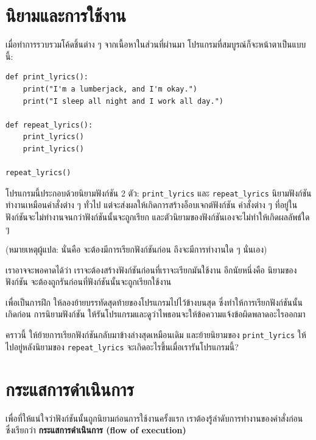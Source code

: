 \section{นิยามและการใช้งาน} %

เมื่อทำการรวบรวมโค้ดชิ้นต่าง ๆ จากเนื้อหาในส่วนที่ผ่านมา โปรแกรมที่สมบูรณ์ก็จะหน้าตาเป็นแบบนี้:

\begin{verbatim}
def print_lyrics():
    print("I'm a lumberjack, and I'm okay.")
    print("I sleep all night and I work all day.")

def repeat_lyrics():
    print_lyrics()
    print_lyrics()

repeat_lyrics()
\end{verbatim}
%
โปรแกรมนี้ประกอบด้วยนิยามฟังก์ชัน 2 ตัว: \verb|print_lyrics| และ \verb|repeat_lyrics|
นิยามฟังก์ชันทำงานเหมือนคำสั่งต่าง ๆ ทั่วไป แต่จะส่งผลให้เกิดการสร้างอ็อบเจกต์ฟังก์ชัน  คำสั่งต่าง ๆ ที่อยู่ใน
ฟังก์ชันจะไม่ทำงานจนกว่าฟังก์ชันนั้นจะถูกเรียก และตัวนิยามของฟังก์ชันเองจะไม่ทำให้เกิดผลลัพธ์ใด ๆ 

(หมายเหตุผู้แปล: นั่นคือ จะต้องมีการเรียกฟังก์ชันก่อน ถึงจะมีการทำงานใด ๆ นั่นเอง)

เราอาจจะพอคาดได้ว่า เราจะต้องสร้างฟังก์ชันก่อนที่เราจะเรียกมันใช้งาน อีกนัยหนึ่งคือ นิยามของฟังก์ชัน
จะต้องถูกรันก่อนที่ฟังก์ชันนั้นจะถูกเรียกใช้งาน

เพื่อเป็นการฝึก ให้ลองย้ายบรรทัดสุดท้ายของโปรแกรมไปไว้ข้างบนสุด ซึ่งทำให้การเรียกฟังก์ชันนั้นเกิดก่อน
การนิยามฟังก์ชัน ให้รันโปรแกรมและดูว่าไพธอนจะให้ข้อความแจ้งข้อผิดพลาดอะไรออกมา

คราวนี้ ให้ย้ายการเรียกฟังก์ชันกลับมาข้างล่างสุดเหมือนเดิม และย้ายนิยามของ \verb|print_lyrics|
ให้ไปอยู่หลังนิยามของ \verb|repeat_lyrics| จะเกิดอะไรขึ้นเมื่อเรารันโปรแกรมนี้?


\section{กระแสการดำเนินการ} %

เพื่อที่ให้แน่ใจว่าฟังก์ชันนั้นถูกนิยามก่อนการใช้งานครั้งแรก เราต้องรู้ลำดับการทำงานของคำสั่งก่อน
ซึ่งเรียกว่า {\bf กระแสการดำเนินการ (flow of execution)}


